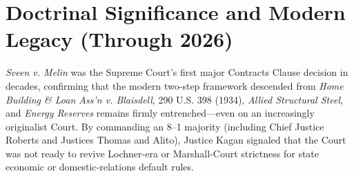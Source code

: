 \documentclass[12pt]{article}
\begin{document}
\section{Doctrinal Significance and Modern Legacy (Through 2026)}
\textit{Sveen v. Melin} was the Supreme Court's first major Contracts Clause decision in decades, confirming that the modern two-step framework descended from \textit{Home Building \& Loan Ass'n v. Blaisdell}, 290 U.S. 398 (1934), \textit{Allied Structural Steel}, and \textit{Energy Reserves} remains firmly entrenched---even on an increasingly originalist Court. By commanding an 8--1 majority (including Chief Justice Roberts and Justices Thomas and Alito), Justice Kagan signaled that the Court was not ready to revive Lochner-era or Marshall-Court strictness for state economic or domestic-relations default rules.
\end{document}
